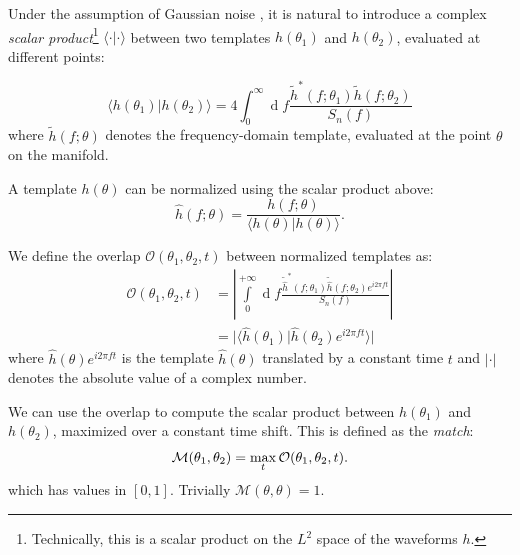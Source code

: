 \documentclass[twocolumn,showpacs,preprintnumbers,nofootinbib,prd,
superscriptaddress,10pt]{revtex4-2}
\renewcommand{\d}[1]{\ensuremath{\operatorname{d}\!{#1}}}
\newcommand{\scalar}[2]{\langle #1|#2 \rangle}
\begin{document}
Under the assumption of Gaussian noise \cite{Creighton_book}, it is natural to introduce a complex \textit{scalar product}\footnote{
Technically, this is a scalar product on the $L^2$ space of the waveforms $h$.}
$\scalar{\cdot}{\cdot}$ between two templates $h(\theta_1)$ and $h(\theta_2)$, evaluated at different points:

\begin{equation} \label{eq:scalar_product}
	\scalar{h(\theta_1)}{h(\theta_2)} = 4 \int_{0}^{\infty} \d{f} \frac{\tilde{h}^*(f;\theta_1) \tilde{h}(f;\theta_2)}{S_n(f)}
\end{equation}
where $\tilde{h}(f; \theta)$ denotes the frequency-domain template, evaluated at the point $\theta$ on the manifold.

A template $h(\theta)$ can be normalized using the scalar product above:
\begin{equation} \label{eq:normalization}
	\hat{h}(f; \theta) = \frac{h(f; \theta)}{\scalar{h(\theta)}{h(\theta)}}.
\end{equation}

We define the overlap $\mathcal{O}(\theta_1,\theta_2, t)$ between normalized templates as:
\begin{align}\label{eq:overlap}
	\mathcal{O}(\theta_1,\theta_2, t) &= \left\lvert \int\limits_{0}^{+\infty} \d{f} \frac{\tilde{\hat{h}}^*(f;\theta_1)\tilde{\hat{h}}(f;\theta_2) e^{i2\pi ft}}{S_n(f)} \right\rvert \nonumber\\
	&= \lvert \scalar{\hat{h}(\theta_1)}{\hat{h}(\theta_2)e^{i 2\pi ft}} \rvert
\end{align}
where $\hat{h}(\theta)e^{i 2\pi ft}$ is the template $\hat{h}(\theta)$ translated by a constant time $t$ and $\lvert \cdot \rvert$ denotes the absolute value of a complex number.

We can use the overlap to compute the scalar product between $h(\theta_1)$ and $h(\theta_2)$, maximized over a constant time shift. This is defined as the {\it match}:
\begin{equation}\label{eq:match}
	\mathcal{M}(\theta_1,\theta_2) = \max_t \mathcal{O}(\theta_1,\theta_2, t). \\
\end{equation}
%
which has values in $[0,1]$. Trivially $\mathcal{M}(\theta,\theta) = 1$.
\end{document}
